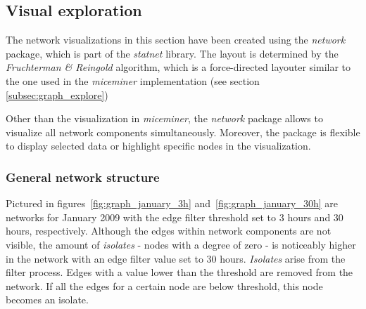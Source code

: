 \subsection{Visual exploration}
\label{subsec:visual_exploration}

The network visualizations in this section have been created using the \textit{network}\cite{network:08} package, which is part of the \textit{statnet}\cite{statnet:03} library. The layout is determined by the \textit{Fruchterman \& Reingold}\cite{fruchterman:91} algorithm, which is a force-directed layouter similar to the one used in the \textit{miceminer} implementation (see section \ref{subsec:graph_explore})

Other than the visualization in \textit{miceminer}, the \textit{network} package allows to visualize all network components simultaneously. Moreover, the package is flexible to display selected data or highlight specific nodes in the visualization. 

\subsubsection{General network structure}
\label{subsubsec:vis_general}    

Pictured in figures~\ref{fig:graph_january_3h} and~\ref{fig:graph_january_30h} are networks for January 2009 with the edge filter threshold set to 3 hours and 30 hours, respectively. Although the edges within network components are not visible, the amount of \textit{isolates} - nodes with a degree of zero - is noticeably higher in the network with an edge filter value set to 30 hours. \textit{Isolates} arise from the filter process. Edges with a value lower than the threshold are removed from the network. If all the edges for a certain node are below threshold, this node becomes an isolate. 

